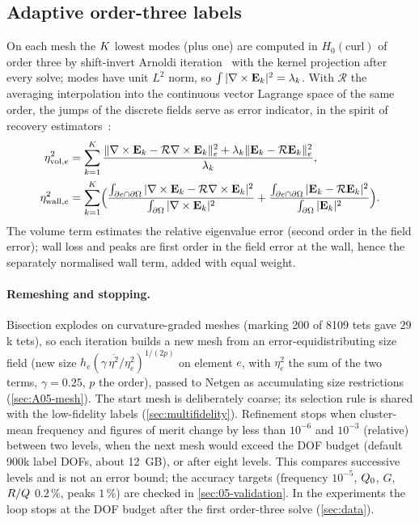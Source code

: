 \subsection{Adaptive order-three labels}\label{sec:05-adaptive}

On each mesh the $K$ lowest modes (plus one) are computed in $H_0(\mathrm{curl})$ of order three by shift-invert Arnoldi iteration~\cite{lehoucq1998arpack} with the kernel projection after every solve; modes have unit $L^2$ norm, so $\int|\nabla\times\mathbf{E}_k|^2=\lambda_k$.
With $\mathcal R$ the averaging interpolation into the continuous vector Lagrange space of the same order, the jumps of the discrete fields serve as error indicator, in the spirit of recovery estimators~\cite{zienkiewicz1987simple}:
\begin{align*}
\eta_{\mathrm{vol},e}^2 &= \sum_{k=1}^{K}\frac{\|\nabla\times\mathbf{E}_k-\mathcal R\nabla\times\mathbf{E}_k\|_e^2+\lambda_k\|\mathbf{E}_k-\mathcal R\mathbf{E}_k\|_e^2}{\lambda_k},\\
\eta_{\mathrm{wall},e}^2 &= \sum_{k=1}^{K}\Bigl(\frac{\int_{\partial e\cap\partial\Omega}|\nabla\times\mathbf{E}_k-\mathcal R\nabla\times\mathbf{E}_k|^2}{\int_{\partial\Omega}|\nabla\times\mathbf{E}_k|^2}+\frac{\int_{\partial e\cap\partial\Omega}|\mathbf{E}_k-\mathcal R\mathbf{E}_k|^2}{\int_{\partial\Omega}|\mathbf{E}_k|^2}\Bigr).
\end{align*}
The volume term estimates the relative eigenvalue error (second order in the field error); wall loss and peaks are first order in the field error at the wall, hence the separately normalised wall term, added with equal weight.

\paragraph{Remeshing and stopping.}
Bisection explodes on curvature-graded meshes (marking 200 of 8109 tets gave $29$k tets), so each iteration builds a new mesh from an error-equidistributing size field (new size $h_e(\gamma\,\overline{\eta^2}/\eta_e^2)^{1/(2p)}$ on element $e$, with $\eta_e^2$ the sum of the two terms, $\gamma=0.25$, $p$ the order), passed to Netgen as accumulating size restrictions (\cref{sec:A05-mesh}).
The start mesh is deliberately coarse; its selection rule is shared with the low-fidelity labels (\cref{sec:multifidelity}).
Refinement stops when cluster-mean frequency and figures of merit change by less than $10^{-6}$ and $10^{-3}$ (relative) between two levels, when the next mesh would exceed the DOF budget (default 900k label DOFs, about \SI{12}{GB}), or after eight levels.
This compares successive levels and is not an error bound; the accuracy targets (frequency $10^{-5}$, $\Qz$, $G$, $R/Q$ $0.2\,\%$, peaks $1\,\%$) are checked in \cref{sec:05-validation}.
In the experiments the loop stops at the DOF budget after the first order-three solve (\cref{sec:data}).

